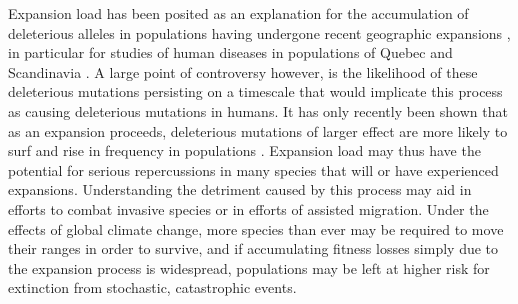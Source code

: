 Expansion load has been posited as an explanation for the accumulation of deleterious alleles in populations having undergone recent geographic expansions \citep{Karlsson:2014}, in particular for studies of human diseases in populations of Quebec \citep{Scriver:2001, Yotova:2005, Labuda:1997} and Scandinavia \citep{Norio:2003}%
. A large point of controversy however, is the likelihood of these deleterious mutations persisting on a timescale that would implicate this process as causing deleterious mutations in humans. It has only recently been shown that as an expansion proceeds, deleterious mutations of larger effect are more likely to surf and rise in frequency in populations \citep{Henn:2015}. Expansion load may thus have the potential for serious repercussions in many species that will or have experienced expansions. Understanding the detriment caused by this process may aid in efforts to combat invasive species or in efforts of assisted migration. Under the effects of global climate change, more species than ever may be required to move their ranges in order to survive, and if accumulating fitness losses simply due to the expansion process is widespread, populations may be left at higher risk for extinction from stochastic, catastrophic events. %

